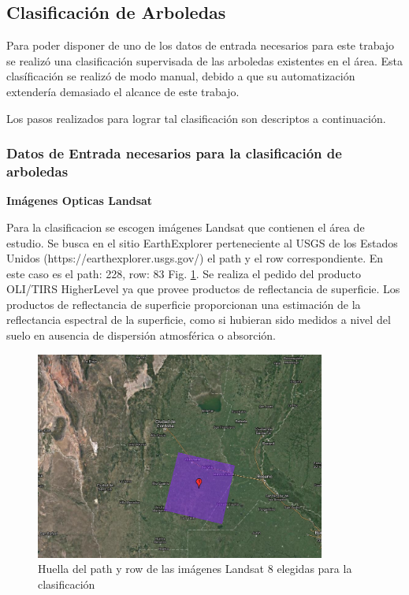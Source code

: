 \documentclass[10pt,a4paper, twoside]{report}
\begin{document}
\subsection{Clasificación de Arboledas}
\label{clasificacionArboledas}

Para poder disponer de uno de los datos de entrada necesarios para este trabajo se realizó una clasificación supervisada de las arboledas existentes en el área. Esta clasíficación se realizó de modo manual, debido a que su automatización extendería demasiado el alcance de este trabajo.

Los pasos realizados para lograr tal clasificación son descriptos a continuación.

\subsubsection{Datos de Entrada necesarios para la clasificación de arboledas}


\textbf{Imágenes Opticas Landsat}
\label{imagenesLandsat}

Para la clasificacion se escogen imágenes Landsat que contienen el área de estudio. Se busca en el sitio EarthExplorer perteneciente al USGS de los Estados Unidos (https://earthexplorer.usgs.gov/) el path y el row correspondiente. En este caso es el path: 228, row: 83 Fig. \ref{footprintLandsat}. Se realiza el pedido del producto OLI/TIRS HigherLevel ya que provee productos de reflectancia de superficie. Los productos de reflectancia de superficie proporcionan una estimación de la reflectancia espectral de la superficie, como si hubieran sido medidos a nivel del suelo en ausencia de dispersión atmosférica o absorción. \cite{OLITIRS} 

\begin{figure}[!htb]
   \centering      
   \includegraphics[width=0.85\textwidth]{imagenes/FootLandsat228_83.jpg}
 \caption{Huella del path y row de las imágenes Landsat 8 elegidas para la clasificación}
 \label{footprintLandsat}
\end{figure}
\end{document}
